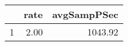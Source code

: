 \begin{table}[h]
\centering
\begin{tabular}{rrr}
  \hline
 & rate & avgSampPSec \\ 
  \hline
1 & 2.00 & 1043.92 \\ 
   \hline
\end{tabular}
\end{table}
